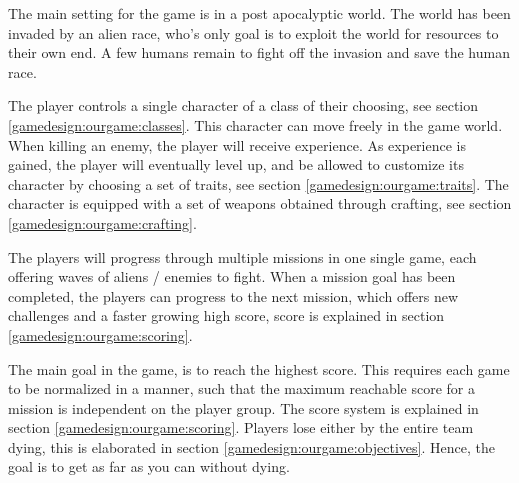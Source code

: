 
The main setting for the game is in a post apocalyptic world.
The world has been invaded by an alien race, who's only goal is to exploit the world for resources to their own end. 
A few humans remain to fight off the invasion and save the human race. 

The player controls a single character of a class of their choosing, see section \ref{gamedesign:ourgame:classes}. 
This character can move freely in the game world.
When killing an enemy, the player will receive experience.
As experience is gained, the player will eventually level up, and be allowed to customize its character by choosing a set of traits, see section \ref{gamedesign:ourgame:traits}.
The character is equipped with a set of weapons obtained through crafting, see section \ref{gamedesign:ourgame:crafting}.

The players will progress through multiple missions in one single game, each offering waves of aliens / enemies to fight. 
When a mission goal has been completed, the players can progress to the next mission, which offers new challenges and a faster growing high score, score is explained in section \ref{gamedesign:ourgame:scoring}.

The main goal in the game, is to reach the highest score. 
This requires each game to be normalized in a manner, such that the maximum reachable score for a mission is independent on the player group.
The score system is explained in section \ref{gamedesign:ourgame:scoring}. 
Players lose either by the entire team dying, this is elaborated in section \ref{gamedesign:ourgame:objectives}. 
Hence, the goal is to get as far as you can without dying.




